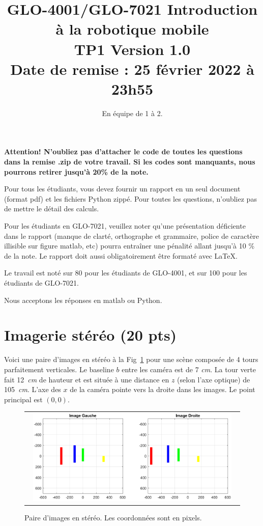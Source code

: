 \documentclass[12pt]{article}
\begin{document}
\title{GLO-4001/GLO-7021 Introduction à la robotique mobile \\  TP1 Version 1.0 \\ Date de remise : 25 février 2022 à 23h55}
\author{En équipe de 1 à 2.}
\maketitle


{\bf Attention! N'oubliez pas d'attacher le code de toutes les questions dans la remise .zip de votre travail. Si les codes sont manquants, nous pourrons retirer jusqu'à 20\% de la note. }

Pour tous les étudiants, vous devez fournir un rapport en un seul document (format pdf) et les fichiers Python zippé. Pour toutes les questions, n'oubliez pas de mettre le détail des calculs.

Pour les étudiants en GLO-7021, veuillez noter qu'une présentation déficiente dans le rapport (manque de clarté, orthographe et grammaire, police de caractère illisible sur figure matlab, etc) pourra entraîner une pénalité allant jusqu'à 10 \% de la note. Le rapport doit aussi obligatoirement être formaté avec \LaTeX.


Le travail est noté sur 80 pour les étudiants de GLO-4001, et sur 100 pour les étudiants de GLO-7021.

Nous acceptons les réponses en matlab ou Python.


\newpage
\section{Imagerie stéréo  (20 pts)}
Voici une paire d'images en stéréo à la Fig~\ref{ImageStereo} pour une scène composée de 4 tours parfaitement verticales. Le baseline $b$ entre les caméra est de 7 \emph{cm}. La tour verte fait 12~\emph{cm} de hauteur et est située à une distance en $z$ (selon l'axe optique) de 105~\emph{cm}. L'axe des $x$ de la caméra pointe vers la droite dans les images. Le point principal est $(0,0)$.

\begin{figure}[ht]
 \begin{center}
  \begin{tabular}{c}
    \includegraphics[width=0.95\textwidth]{ImageStereo2.png} 
  \end{tabular}
 \end{center}
\vspace{-0.3in}
 \caption{Paire d'images en stéréo. Les coordonnées sont en pixels.}
 \label{ImageStereo}
\end{figure}
\end{document}
